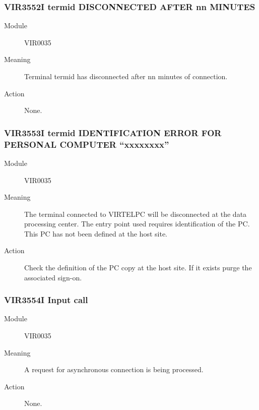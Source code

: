 \documentclass[letterpaper,10pt,english]{sphinxmanual}
\begin{document}
\subsubsection{VIR3552I termid DISCONNECTED AFTER nn MINUTES}
\label{\detokenize{messages:vir3552i-termid-disconnected-after-nn-minutes}}\begin{description}
\item[{Module}] \leavevmode
VIR0035

\item[{Meaning}] \leavevmode
Terminal termid has disconnected after nn minutes of connection.

\item[{Action}] \leavevmode
None.

\end{description}


\subsubsection{VIR3553I termid IDENTIFICATION ERROR FOR PERSONAL COMPUTER “xxxxxxxx”}
\label{\detokenize{messages:vir3553i-termid-identification-error-for-personal-computer-xxxxxxxx}}\begin{description}
\item[{Module}] \leavevmode
VIR0035

\item[{Meaning}] \leavevmode
The terminal connected to VIRTELPC will be disconnected at the data processing center. The entry point used requires identification of the PC. This PC has not been defined at the host site.

\item[{Action}] \leavevmode
Check the definition of the PC copy at the host site. If it exists purge the associated sign-on.

\end{description}


\subsubsection{VIR3554I Input call}
\label{\detokenize{messages:vir3554i-input-call}}\begin{description}
\item[{Module}] \leavevmode
VIR0035

\item[{Meaning}] \leavevmode
A request for asynchronous connection is being processed.

\item[{Action}] \leavevmode
None.

\end{description}
\end{document}
